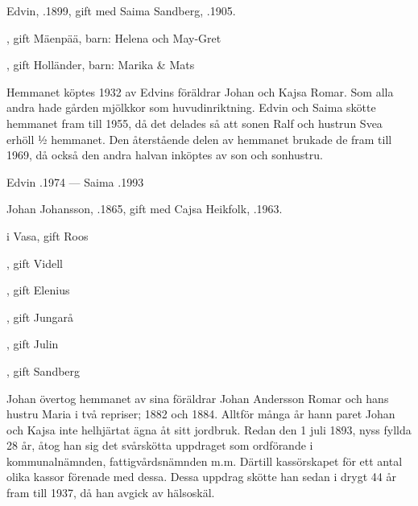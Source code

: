 Edvin, .1899, gift med Saima Sandberg, .1905.
\begin{jhchildren}
  \item {}, gift Mäenpää, barn: Helena och May-Gret
  \item {}
  \item {}, gift Holländer, barn: Marika \& Mats
\end{jhchildren}

Hemmanet köptes  1932  av Edvins föräldrar Johan och Kajsa Romar. Som alla andra hade gården mjölkkor som huvudinriktning. Edvin och Saima skötte hemmanet fram till 1955, då det delades så att sonen Ralf och hustrun Svea erhöll ½ hemmanet.  Den återstående delen av hemmanet brukade de fram till 1969, då också den andra halvan inköptes av son och sonhustru.

Edvin .1974  ---  Saima .1993


Johan Johansson, .1865, gift med Cajsa Heikfolk, .1963.
\begin{jhchildren}
  \item {} i Vasa, gift Roos
  \item {}, gift Videll
  \item {}, gift Elenius
  \item {}, gift Jungarå
  \item {}
  \item {}, gift Julin
  \item {}, gift Sandberg
\end{jhchildren}
Johan övertog hemmanet av sina föräldrar Johan Andersson Romar och hans hustru Maria i två repriser;  1882 och 1884. Alltför många år hann paret Johan och Kajsa inte helhjärtat ägna åt sitt jordbruk. Redan den 1 juli 1893, nyss fyllda 28 år, åtog han sig det svårskötta uppdraget som ordförande i kommunalnämnden, fattigvårdsnämnden m.m. Därtill kassörskapet för ett antal olika kassor förenade med dessa. Dessa uppdrag skötte han sedan i drygt 44 år fram till 1937, då han avgick av hälsoskäl.

